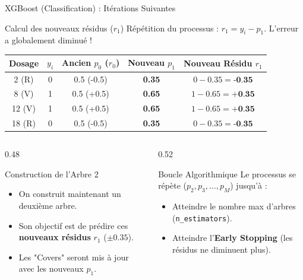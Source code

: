 \begin{frame}{XGBoost (Classification) : Itérations Suivantes}
    \vspace{-0.2cm}
    \begin{block}{Calcul des nouveaux résidus ($r_1$)}
        \scriptsize Répétition du processus : $r_1 = y_i - p_1$. L'erreur a globalement diminué !
        
        \vspace{0.1cm}
        \centering
        \begin{tabular}{|c|c|c|c|c|}
            \hline
            \textbf{Dosage} & $y_i$ & \textbf{Ancien } $p_0$ ($r_0$) & \textbf{Nouveau } $p_1$ & \textbf{Nouveau Résidu } $r_1$ \\
            \hline
            2 (R) & 0 & 0.5 (-0.5) & \textbf{0.35} & $0 - 0.35 = \textbf{-0.35}$ \\
            8 (V) & 1 & 0.5 (+0.5) & \textbf{0.65} & $1 - 0.65 = \textbf{+0.35}$ \\
            12 (V) & 1 & 0.5 (+0.5) & \textbf{0.65} & $1 - 0.65 = \textbf{+0.35}$ \\
            18 (R) & 0 & 0.5 (-0.5) & \textbf{0.35} & $0 - 0.35 = \textbf{-0.35}$ \\
            \hline
        \end{tabular}
    \end{block}

    \begin{columns}[T]
        \begin{column}{0.48\textwidth}
            \begin{block}{Construction de l'Arbre 2}
                \scriptsize
                \begin{itemize}
                    \item On construit maintenant un deuxième arbre.
                    \item Son objectif est de prédire ces \textbf{nouveaux résidus} $r_1$ ($\pm 0.35$).
                    \item Les "Covers" seront mis à jour avec les nouveaux $p_1$.
                \end{itemize}
            \end{block}
        \end{column}
        
        \begin{column}{0.52\textwidth}
            \begin{block}{Boucle Algorithmique}
                \scriptsize
                Le processus se répète ($p_2, p_3, \dots, p_M$) jusqu'à :
                \begin{itemize}
                    \item Atteindre le nombre max d'arbres (\texttt{n\_estimators}).
                    \item Atteindre l'\textbf{Early Stopping} (les résidus ne diminuent plus).
                \end{itemize}
            \end{block}
        \end{column}
    \end{columns}
\end{frame}
